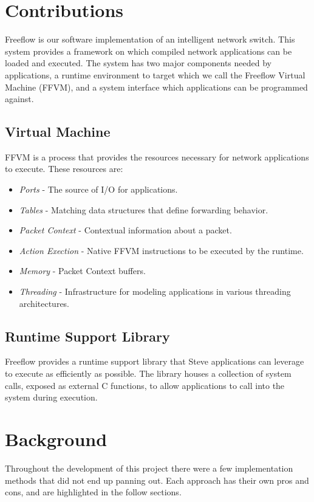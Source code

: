 \section{Contributions}
Freeflow is our software implementation of an intelligent network switch. This
system provides a framework on which compiled network applications can be
loaded and executed. The system has two major components needed by
applications, a runtime environment to target which we call the Freeflow
Virtual Machine (FFVM), and a system interface which applications can be
programmed against.

\subsection{Virtual Machine}
FFVM is a process that provides the resources necessary for network
applications to execute. These resources are:

\begin{itemize}
\item \emph{Ports} - The source of I/O for applications.
\item \emph{Tables} - Matching data structures that define forwarding behavior.
\item \emph{Packet Context} - Contextual information about a packet.
\item \emph{Action Exection} - Native FFVM instructions to be executed by the
runtime.
\item \emph{Memory} - Packet Context buffers.
\item \emph{Threading} - Infrastructure for modeling applications in various
threading architectures.
\end{itemize}

\subsection{Runtime Support Library}
Freeflow provides a runtime support library that Steve applications can leverage
to execute as efficiently as possible. The library houses a collection
of system calls, exposed as external C functions, to allow applications to call
into the system during execution.

\section{Background}
Throughout the development of this project there were a few implementation
methods that did not end up panning out. Each approach has their own pros
and cons, and are highlighted in the follow sections.

